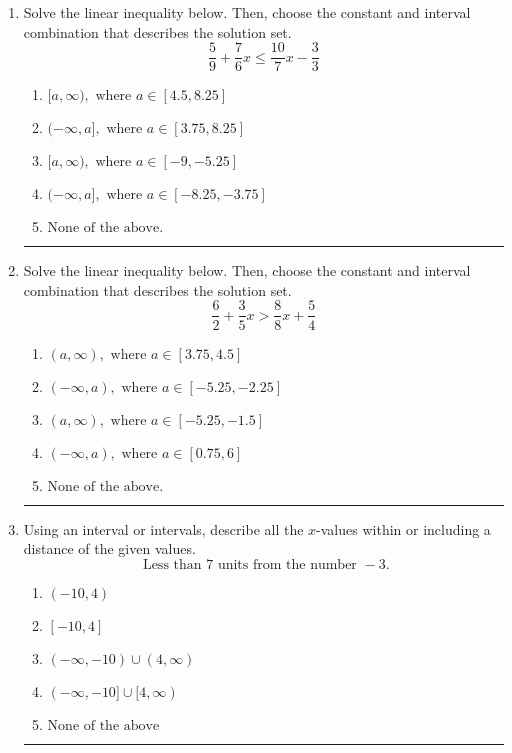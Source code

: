 \documentclass[14pt]{extbook}
\newcommand{\litem}[1]{\item#1\hspace*{-1cm}\rule{\textwidth}{0.4pt}}
\begin{document}
\begin{enumerate}
{\begin{enumerate}[label=\Alph*.]
\end{enumerate} }
\litem{
Solve the linear inequality below. Then, choose the constant and interval combination that describes the solution set.\[ \frac{5}{9} + \frac{7}{6} x \leq \frac{10}{7} x - \frac{3}{3} \]\begin{enumerate}[label=\Alph*.]
\item \( [a, \infty), \text{ where } a \in [4.5, 8.25] \)
\item \( (-\infty, a], \text{ where } a \in [3.75, 8.25] \)
\item \( [a, \infty), \text{ where } a \in [-9, -5.25] \)
\item \( (-\infty, a], \text{ where } a \in [-8.25, -3.75] \)
\item \( \text{None of the above}. \)

\end{enumerate} }
\litem{
Solve the linear inequality below. Then, choose the constant and interval combination that describes the solution set.\[ \frac{6}{2} + \frac{3}{5} x > \frac{8}{8} x + \frac{5}{4} \]\begin{enumerate}[label=\Alph*.]
\item \( (a, \infty), \text{ where } a \in [3.75, 4.5] \)
\item \( (-\infty, a), \text{ where } a \in [-5.25, -2.25] \)
\item \( (a, \infty), \text{ where } a \in [-5.25, -1.5] \)
\item \( (-\infty, a), \text{ where } a \in [0.75, 6] \)
\item \( \text{None of the above}. \)

\end{enumerate} }
\litem{
Using an interval or intervals, describe all the $x$-values within or including a distance of the given values.\[ \text{ Less than } 7 \text{ units from the number } -3. \]\begin{enumerate}[label=\Alph*.]
\item \( (-10, 4) \)
\item \( [-10, 4] \)
\item \( (-\infty, -10) \cup (4, \infty) \)
\item \( (-\infty, -10] \cup [4, \infty) \)
\item \( \text{None of the above} \)

\end{enumerate} }
\end{enumerate}
\end{document}

